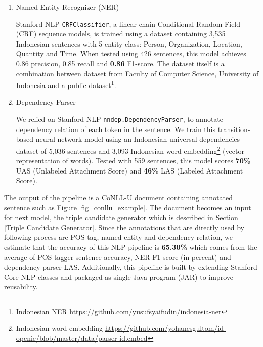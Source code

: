 \documentclass[conference,compsoc,12pt]{IEEEtran}
\begin{document}
\begin{enumerate}
This lemmatizer yields \textbf{99\%} accuracy when tested using dataset of 5,638 token-lemma pairs\footnote{Indonesian Lemmatizer \url{https://github.com/davidchristiandy/lemmatizer}}. We use lemma as one of the features for NER classifier. \\

\item Named-Entity Recognizer (NER)

Stanford NLP \verb|CRFClassifier|\cite{finkel2005incorporating}, a linear chain Conditional Random Field (CRF) sequence models, is trained using a dataset containing 3,535 Indonesian sentences with 5 entity class: Person, Organization, Location, Quantity and Time. When tested using 426 sentences, this model achieves 0.86 precision, 0.85 recall and \textbf{0.86} F1-score. The dataset itself is a combination between dataset from Faculty of Computer Science, University of Indonesia and a public dataset\footnote{Indonesian NER \url{https://github.com/yusufsyaifudin/indonesia-ner}}. \\

\item Dependency Parser

We relied on Stanford NLP \verb|nndep.DependencyParser|\cite{chen2014fast}, to annotate dependency relation of each token in the sentence. We train this transition-based neural network model using an Indonesian universal dependencies dataset of 5,036 sentences and 3,093 Indonesian word embedding\footnote{Indonesian word embedding \url{https://github.com/yohanesgultom/id-openie/blob/master/data/parser-id.embed}} (vector representation of words). Tested with 559 sentences, this model scores \textbf{70\%} UAS (Unlabeled Attachment Score) and \textbf{46\%} LAS (Labeled Attachment Score).

\end{enumerate}

The output of the pipeline is a CoNLL-U document containing annotated sentence such as Figure \ref{fig_conllu_example}. The document becomes an input for next model, the triple candidate generator which is described in Section \ref{Triple Candidate Generator}. Since the annotations that are directly used by following process are POS tag, named entity and dependency relation, we estimate that the accuracy of this NLP pipeline is \textbf{65.30\%} which comes from the average of POS tagger sentence accuracy, NER F1-score (in percent) and dependency parser LAS. Additionally, this pipeline is built by extending Stanford Core NLP classes and packaged as single Java program (JAR) to improve reusability.
\end{document}
